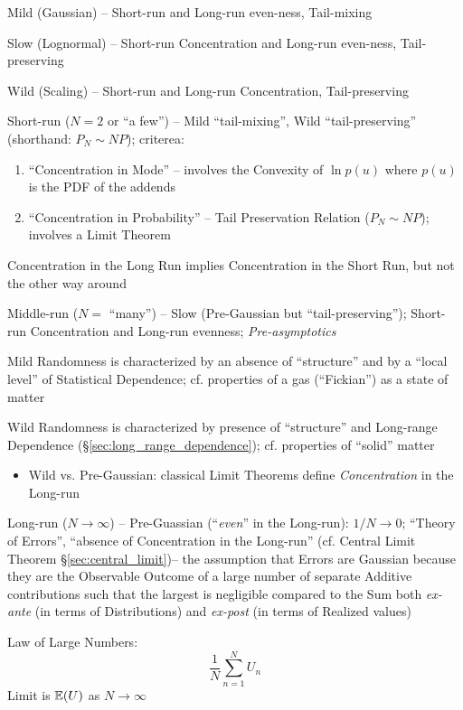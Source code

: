 Mild (Gaussian) -- Short-run and Long-run even-ness, Tail-mixing

Slow (Lognormal) -- Short-run Concentration and Long-run even-ness,
Tail-preserving

Wild (Scaling) -- Short-run and Long-run Concentration, Tail-preserving

Short-run ($N=2$ or ``a few'') -- Mild ``tail-mixing'', Wild
``tail-preserving'' (shorthand: $P_N \sim N P$); criterea:
\begin{enumerate}
  \item ``Concentration in Mode'' -- involves the Convexity of $\ln p(u)$ where
    $p(u)$ is the PDF of the addends
  \item ``Concentration in Probability'' -- Tail Preservation Relation
    ($P_N \sim N P$); involves a Limit Theorem
\end{enumerate}

Concentration in the Long Run implies Concentration in the Short Run, but not
the other way around

Middle-run ($N =$ ``many'') -- Slow (Pre-Gaussian but ``tail-preserving'');
Short-run Concentration and Long-run evenness; \emph{Pre-asymptotics}

Mild Randomness is characterized by an absence of ``structure'' and by a ``local
level'' of Statistical Dependence; cf. properties of a gas (``Fickian'') as a
state of matter

Wild Randomness is characterized by presence of ``structure'' and Long-range
Dependence (\S\ref{sec:long_range_dependence}); cf. properties of ``solid''
matter

\begin{itemize}
  \item Wild vs. Pre-Gaussian: classical Limit Theorems define
    \emph{Concentration} in the Long-run
\end{itemize}

Long-run ($N \to \infty$) -- Pre-Guassian (``\emph{even}'' in the Long-run):
$1 / N \to 0$; ``Theory of Errors'', ``absence of Concentration in the
Long-run'' (cf. Central Limit Theorem \S\ref{sec:central_limit})-- the
assumption that Errors are Gaussian because they are the Observable Outcome of a
large number of separate Additive contributions such that the largest is
negligible compared to the Sum both \emph{ex-ante} (in terms of Distributions)
and \emph{ex-post} (in terms of Realized values)

Law of Large Numbers:
\[
  \frac{1}{N} \sum_{n=1}^N U_n
\]
Limit is $\mathbb{E}(U)$ as $N \to \infty$

